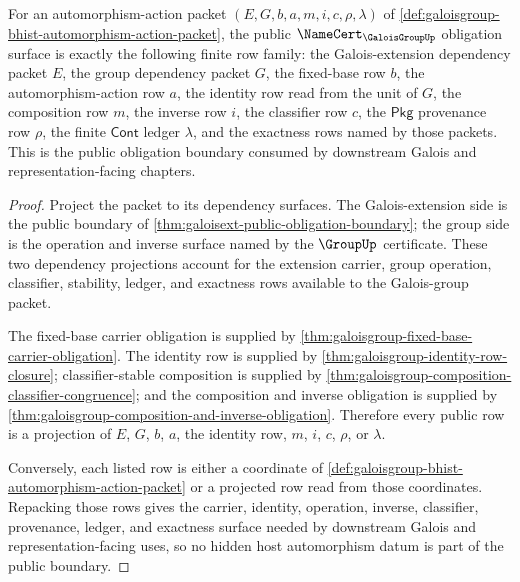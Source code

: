 \begin{theorem}
\label{thm:galoisgroup-public-namecert-obligation-boundary}
For an automorphism-action packet $(E,G,b,a,m,i,c,\rho,\lambda)$ of
\autoref{def:galoisgroup-bhist-automorphism-action-packet}, the public
$\NameCert_{\GaloisGroupUp}$ obligation surface is exactly the following
finite row family: the Galois-extension dependency packet $E$, the group
dependency packet $G$, the fixed-base row $b$, the automorphism-action row
$a$, the identity row read from the unit of $G$, the composition row $m$, the
inverse row $i$, the classifier row $c$, the $\mathsf{Pkg}$ provenance row
$\rho$, the finite $\mathsf{Cont}$ ledger $\lambda$, and the exactness rows
named by those packets. This is the public
obligation boundary consumed by downstream Galois and representation-facing
chapters.
\end{theorem}
\begin{proof}
Project the packet to its dependency surfaces. The Galois-extension side is
the public boundary of
\autoref{thm:galoisext-public-obligation-boundary}; the group side is the
operation and inverse surface named by the $\GroupUp$ certificate. These two
dependency projections account for the extension carrier, group operation,
classifier, stability, ledger, and exactness rows available to the
Galois-group packet.

The fixed-base carrier obligation is supplied by
\autoref{thm:galoisgroup-fixed-base-carrier-obligation}. The identity row is
supplied by \autoref{thm:galoisgroup-identity-row-closure}; classifier-stable
composition is supplied by
\autoref{thm:galoisgroup-composition-classifier-congruence}; and the
composition and inverse obligation is supplied by
\autoref{thm:galoisgroup-composition-and-inverse-obligation}. Therefore every
public row is a projection of $E$, $G$, $b$, $a$, the identity row, $m$, $i$,
$c$, $\rho$, or $\lambda$.

Conversely, each listed row is either a coordinate of
\autoref{def:galoisgroup-bhist-automorphism-action-packet} or a projected row
read from those coordinates. Repacking those rows gives the carrier, identity,
operation, inverse, classifier, provenance, ledger, and exactness surface needed
by downstream Galois and representation-facing uses, so no hidden host
automorphism datum is part of the public boundary.
\end{proof}


